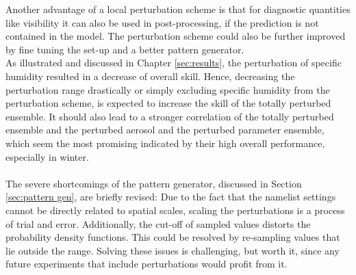 Another advantage of a local perturbation scheme is that for diagnostic quantities like visibility it can also be used in post-processing, if the prediction is not contained in the model. The perturbation scheme could also be further improved by fine tuning the set-up and a better pattern generator. \\
As illustrated and discussed in Chapter \ref{sec:results}, the perturbation of specific humidity resulted in a decrease of overall skill. Hence, decreasing the perturbation range drastically or simply excluding specific humidity from the perturbation scheme, is expected to increase the skill of the totally perturbed ensemble. It should also lead to a stronger correlation of the totally perturbed ensemble and the perturbed aerosol and the perturbed parameter ensemble, which seem the most promising indicated by their high overall performance, especially in winter.\\ \\
The severe shortcomings of the pattern generator, discussed in Section \ref{sec:pattern gen}, are briefly revised:  Due to the fact that the namelist settings cannot be directly related to spatial scales, scaling the perturbations is a process of trial and error. Additionally, the cut-off of sampled values distorts the probability density functions. This could be resolved by re-sampling values that lie outside the range.
Solving these issues is challenging, but worth it, since any future experiments that include perturbations would profit from it.
